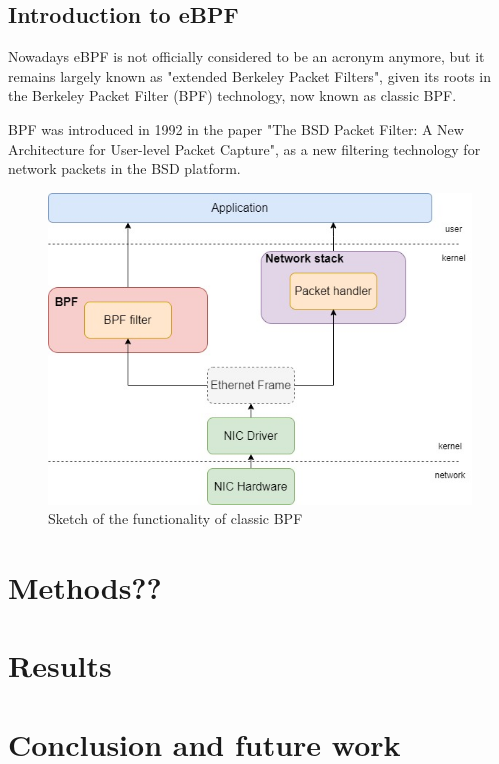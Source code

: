 \documentclass[12pt]{report} %
\begin{document}
\section{Introduction to eBPF}
Nowadays eBPF is not officially considered to be an acronym anymore, but it remains largely known as "extended Berkeley Packet Filters", given its roots in the Berkeley Packet Filter (BPF) technology, now known as classic BPF.

BPF was introduced in 1992 in the paper "The BSD Packet Filter: A New Architecture for User-level Packet Capture"\cite{bpf_bsd_origin}, as a new filtering technology for network packets in the BSD platform.


\begin{figure}[h]
	\centering
	\includegraphics[width=12cm, keepaspectratio=true]{classic_bpf.jpg}
	\caption{Sketch of the functionality of classic BPF}
\end{figure}





\chapter{Methods??}


\chapter{Results}


\chapter{Conclusion and future work}
\end{document}
